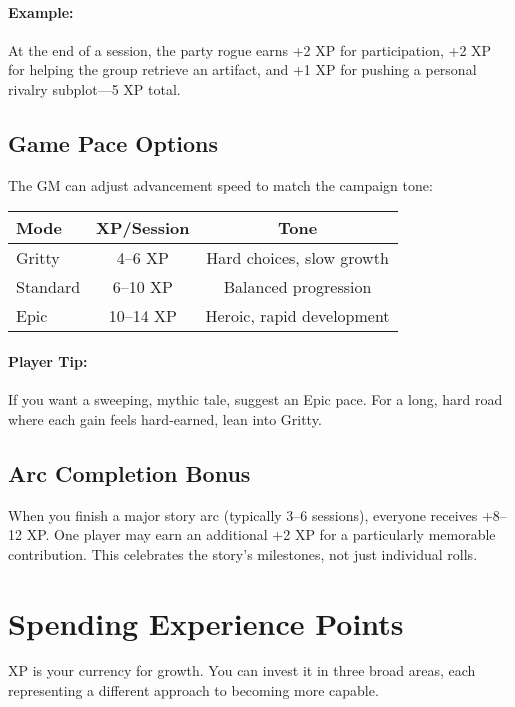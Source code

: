 \begin{multicols}{2}
\paragraph{Example:}  
At the end of a session, the party rogue earns +2 XP for participation, +2 XP for helping the group retrieve an artifact, and +1 XP for pushing a personal rivalry subplot—5 XP total.

\subsection*{Game Pace Options}
The GM can adjust advancement speed to match the campaign tone:

\begin{center}
\small
\begin{tabular}{lcc}
\toprule
\textbf{Mode} & \textbf{XP/Session} & \textbf{Tone} \\
\midrule
Gritty & 4–6 XP & Hard choices, slow growth \\
Standard & 6–10 XP & Balanced progression \\
Epic & 10–14 XP & Heroic, rapid development \\
\bottomrule
\end{tabular}
\end{center}

\paragraph{Player Tip:} If you want a sweeping, mythic tale, suggest an Epic pace. For a long, hard road where each gain feels hard-earned, lean into Gritty.

\subsection*{Arc Completion Bonus}
When you finish a major story arc (typically 3–6 sessions), everyone receives +8–12 XP. One player may earn an additional +2 XP for a particularly memorable contribution. This celebrates the story’s milestones, not just individual rolls.

\section{Spending Experience Points}

XP is your currency for growth. You can invest it in three broad areas, each representing a different approach to becoming more capable.


\end{multicols}
